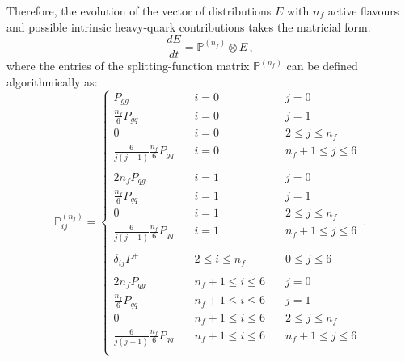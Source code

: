 \documentclass[10pt,a4paper]{article}
\begin{document}
Therefore, the evolution of the vector of distributions $E$ with $n_f$
active flavours and possible intrinsic heavy-quark contributions takes
the matricial form:
\begin{equation}
\frac{dE}{dt} = \mathbb{P}^{(n_f)}\otimes E\,,
\end{equation}
where the entries of the splitting-function matrix
$\mathbb{P}^{(n_f)}$ can be defined algorithmically as:
\begin{equation}\label{eq:splittingalg}
\mathbb{P}_{ij}^{(n_f)}=
\left\{
\begin{array}{lll}
P_{gg} & \quad i = 0 &\quad j = 0\\
\frac{n_f}{6}P_{gq} & \quad i = 0 & \quad j=1\\
0 &\quad i = 0 & \quad 2 \leq j \leq n_f\\
\frac{6}{j(j-1)}\frac{n_f}{6}P_{gq} &\quad i = 0 & \quad n_f+1 \leq j \leq 6\\
\\
2n_fP_{qg} & \quad i = 1 &\quad j = 0\\
\frac{n_f}{6}P_{qq} & \quad i = 1 & \quad j=1\\
0 &\quad i = 1 & \quad 2 \leq j \leq n_f\\
\frac{6}{j(j-1)}\frac{n_f}{6}P_{qq} &\quad i = 1 & \quad n_f+1 \leq j \leq 6\\
\\
\delta_{ij}P^+ & \quad 2 \leq i \leq n_f & \quad 0 \leq j \leq 6\\
\\
2n_fP_{qg} & \quad n_f+1 \leq i \leq 6  &\quad j = 0\\
\frac{n_f}{6}P_{qq} & \quad n_f+1 \leq i \leq 6  & \quad j=1\\
0 &\quad n_f+1 \leq i \leq 6 & \quad 2 \leq j \leq n_f\\
\frac{6}{j(j-1)}\frac{n_f}{6}P_{qq} &\quad n_f+1 \leq i \leq 6 & \quad n_f+1 \leq j \leq 6\\
\end{array}
\right.\,.
\end{equation}
\end{document}
